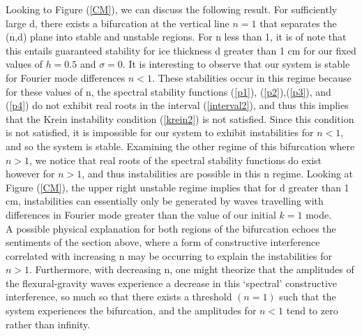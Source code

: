 \documentclass{article}
\begin{document}
Looking to Figure (\ref{CM}), we can discuss the following result. For sufficiently large d, there exists a bifurcation at the vertical line \(n = 1\) that separates the (n,d) plane into stable and unstable regions. For n less than 1, it is of note that this entails guaranteed stability for ice thickness d greater than 1 cm for our fixed values of \(h = 0.5\) and \(\sigma = 0\). It is interesting to observe that our system is stable for Fourier mode differences \(n<1\). These stabilities occur in this regime because for these values of n, the spectral stability functions (\ref{p1}), (\ref{p2}),(\ref{p3}), and (\ref{p4}) do not exhibit real roots in the interval (\ref{interval2}), and thus this implies that the Krein instability condition (\ref{krein2}) is not satisfied. Since this condition is not satisfied, it is impossible for our system to exhibit instabilities for \(n<1\), and so the system is stable. Examining the other regime of this bifurcation where \(n > 1\), we notice that real roots of the spectral stability functions do exist however for \(n>1\), and thus instabilities are possible in this n regime. Looking at Figure (\ref{CM}), the upper right unstable regime implies that for d greater than 1 cm, instabilities can essentially only be generated by waves travelling with differences in Fourier mode greater than the value of our initial \(k = 1\) mode. \\



A possible physical explanation for both regions of the bifurcation echoes the sentiments of the section above, where a form of constructive interference correlated with increasing n may be occurring to explain the instabilities for \(n>1\). Furthermore, with decreasing n, one might theorize that the amplitudes of the flexural-gravity waves experience a decrease in this `spectral' constructive interference, so much so that there exists a threshold \((n = 1)\) such that the system experiences the bifurcation, and the amplitudes for \(n < 1\) tend to zero rather than infinity. 
\\
\end{document}
